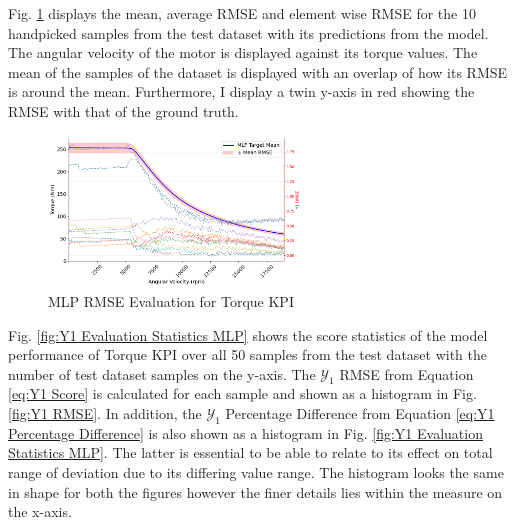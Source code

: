 \documentclass{report} %
\begin{document}
Fig. \ref{fig:MLP RMSE Evaluation for 2D KPI(Torque)} displays the mean, average \ac{RMSE} and element wise \ac{RMSE} for the 10 handpicked samples from the test dataset 
with its predictions from the model. 
The angular velocity of the motor is displayed against its torque values.
The mean of the samples of the dataset is displayed with an overlap of how its \ac{RMSE} is around the mean.
Furthermore, I display a twin y-axis in red showing the \ac{RMSE} with that of the ground truth.

\begin{figure}[H]
    \centering
    \includegraphics[width=0.6\textwidth]{./ReportImages/RMSE_MLP_y1.png} 
    \caption{\ac{MLP} \ac{RMSE} Evaluation for Torque \ac{KPI}} 
    \label{fig:MLP RMSE Evaluation for 2D KPI(Torque)}
\end{figure}

Fig. \ref{fig:Y1 Evaluation Statistics MLP} shows the score statistics of the model performance of Torque \ac{KPI} over all 50 samples from the test dataset 
with the number of test dataset samples on the y-axis.
The $\mathcal{Y}_1$ \ac{RMSE} from Equation \ref{eq:Y1 Score} is calculated for each sample and shown as a histogram in Fig. \ref{fig:Y1 RMSE}.
In addition, the $\mathcal{Y}_1$ Percentage Difference from Equation \ref{eq:Y1 Percentage Difference} is also shown as a histogram in Fig. 
\ref{fig:Y1 Evaluation Statistics MLP}. The latter is essential to be able to relate to its effect on total range of deviation due to its differing value range. 
The histogram looks the same in shape for both the figures however the finer details lies within the measure on the x-axis.
\end{document}
